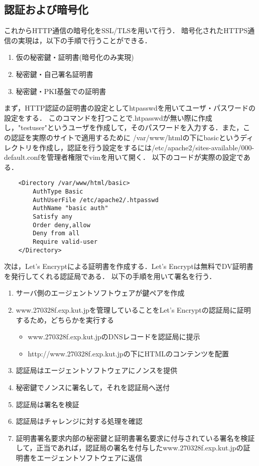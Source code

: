 \documentclass[divpdfmx]{jlreq}
\begin{document}
\subsection{認証および暗号化}
これからHTTP通信の暗号化をSSL/TLSを用いて行う．
暗号化されたHTTPS通信の実現は，以下の手順で行うことができる．
\begin{enumerate}
    \item 仮の秘密鍵・証明書(暗号化のみ実現)
    \item 秘密鍵・自己署名証明書
    \item 秘密鍵・PKI基盤での証明書
\end{enumerate}
まず，HTTP認証の証明書の設定としてhtpasswdを用いてユーザ・パスワードの設定をする．
このコマンドを打つことで.htpasswdが無い際に作成し，"testuser"というユーザを作成して，そのパスワードを入力する．また，この認証を実際のサイトで適用するために
/var/www/htmlの下にbasicというディレクトリを作成し，認証を行う設定をするには/etc/apache2/sites-available/000-default.confを管理者権限でvimを用いて開く．
以下のコードが実際の設定である．
\begin{lstlisting}
    <Directory /var/www/html/basic>
        AuthType Basic
        AuthUserFile /etc/apache2/.htpasswd
        AuthName "basic auth"
        Satisfy any
        Order deny,allow
        Deny from all
        Require valid-user
    </Directory>
\end{lstlisting}
次は，Let's Encryptによる証明書を作成する．Let's Encryptは無料でDV証明書を発行してくれる認証局である．
以下の手順を用いて署名を行う．
\begin{enumerate}
    \item サーバ側のエージェントソフトウェアが鍵ペアを作成
    \item www.270328f.exp.kut.jpを管理していることをLet's Encryptの認証局に証明するため，どちらかを実行する
    \begin{itemize}
        \item www.270328f.exp.kut.jpのDNSレコードを認証局に提示
        \item http://www.270328f.exp.kut.jpの下にHTMLのコンテンツを配置
    \end{itemize}
    \item 認証局はエージェントソフトウェアにノンスを提供
    \item 秘密鍵でノンスに署名して，それを認証局へ送付
    \item 認証局は署名を検証
    \item 認証局はチャレンジに対する処理を確認
    \item 証明書署名要求内部の秘密鍵と証明書署名要求に付与されている署名を検証して，正当であれば，認証局の署名を付与したwww.270328f.exp.kut.jpの証明書をエージェントソフトウェアに返信
\end{enumerate}
\end{document}
